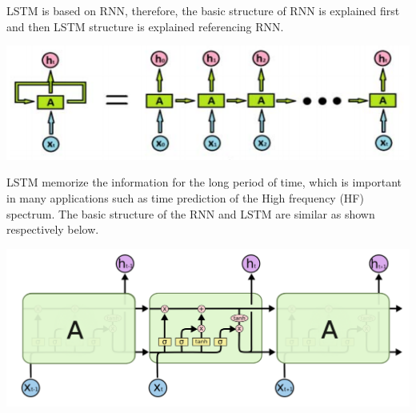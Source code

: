 \documentclass[letterpaper, 10.5pt,landscape]{article}
\begin{document}
\begin{multicols*}{3}



\vspace{3pt}
LSTM is based on RNN, therefore, the basic structure of RNN is explained first and then LSTM structure is explained referencing RNN. 
\vspace{-5pt}

\begin{center}
    \begin{minipage}{0.75\linewidth}
    \includegraphics[width=\textwidth]{figures/RNNLoop.png}
    \end{minipage}
\end{center}
\vspace{-5pt}



LSTM memorize the information for the long period of time, which is important in many applications such as time prediction of the High frequency (HF) spectrum. The basic structure of the RNN and LSTM are similar as shown respectively below.


\vspace{-5pt}

\begin{center}
    \begin{minipage}{0.75\linewidth}
    \includegraphics[width=\textwidth]{figures/LSTMCell.png}
    \end{minipage}
\end{center}
\vspace{-5pt}





\end{multicols*}
\end{document}
